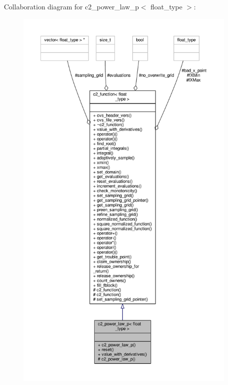 Collaboration diagram for c2\+\_\+power\+\_\+law\+\_\+p$<$ float\+\_\+type $>$\+:
\nopagebreak
\begin{figure}[H]
\begin{center}
\leavevmode
\includegraphics[height=550pt]{classc2__power__law__p__coll__graph}
\end{center}
\end{figure}
